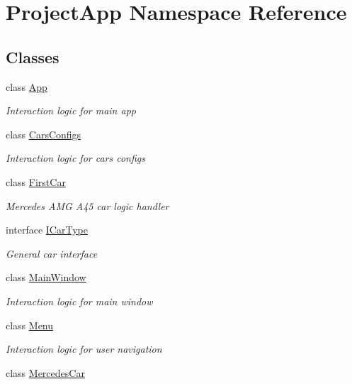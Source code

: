\hypertarget{namespace_project_app}{}\section{Project\+App Namespace Reference}
\label{namespace_project_app}
\subsection*{Classes}
\begin{DoxyCompactItemize}
\item 
class \mbox{\hyperlink{class_project_app_1_1_app}{App}}
\begin{DoxyCompactList}\small\item\em Interaction logic for main app \end{DoxyCompactList}\item 
class \mbox{\hyperlink{class_project_app_1_1_cars_configs}{Cars\+Configs}}
\begin{DoxyCompactList}\small\item\em Interaction logic for cars configs \end{DoxyCompactList}\item 
class \mbox{\hyperlink{class_project_app_1_1_first_car}{First\+Car}}
\begin{DoxyCompactList}\small\item\em Mercedes A\+MG A45 car logic handler \end{DoxyCompactList}\item 
interface \mbox{\hyperlink{interface_project_app_1_1_i_car_type}{I\+Car\+Type}}
\begin{DoxyCompactList}\small\item\em General car interface \end{DoxyCompactList}\item 
class \mbox{\hyperlink{class_project_app_1_1_main_window}{Main\+Window}}
\begin{DoxyCompactList}\small\item\em Interaction logic for main window \end{DoxyCompactList}\item 
class \mbox{\hyperlink{class_project_app_1_1_menu}{Menu}}
\begin{DoxyCompactList}\small\item\em Interaction logic for user navigation \end{DoxyCompactList}\item 
class \mbox{\hyperlink{class_project_app_1_1_mercedes_car}{Mercedes\+Car}}

\end{DoxyCompactItemize}
